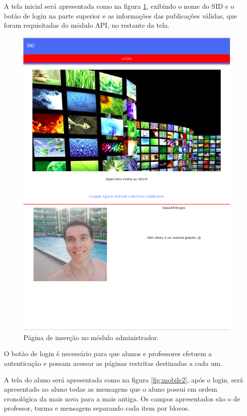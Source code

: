 A tela inicial será apresentada como na figura \ref{fig:mobile1}, exibindo o nome do SID e o botão de login na parte superior e as informações das publicações válidas, que foram requisitadas do módulo API, no restante da tela.
\begin{figure}[H]
\centering
\includegraphics[scale=0.5]{figuras/mobile1}
\caption{Página de inserção no módulo administrador.}
\label{fig:mobile1}
\end{figure}



O botão de login é necessário para que alunos e professores efetuem a autenticação e possam acessar as páginas restritas destinadas a cada um.

A tela do aluno será apresentada como na figura \ref{fig:mobile2}, após o login, será apresentado ao aluno todas as mensagens que o aluno possui em ordem cronológica da mais nova para a mais antiga. Os campos apresentados são o de professor, turma e mensagem separando cada item por blocos.

